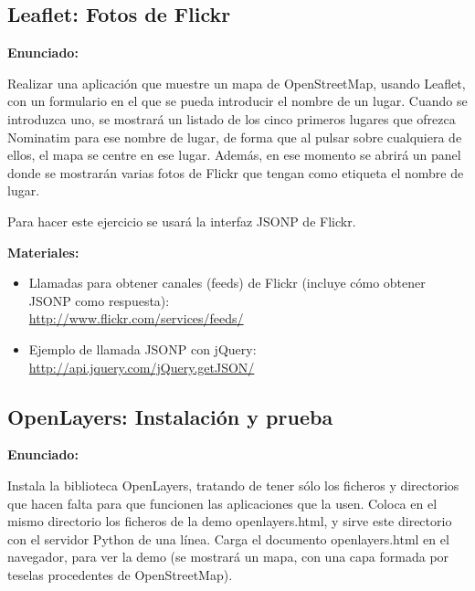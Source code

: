 \subsection{Leaflet: Fotos de Flickr}
\label{subsec:apis-leaflet-flickr}

\textbf{Enunciado:}

Realizar una aplicación que muestre un mapa de OpenStreetMap, usando Leaflet, con un formulario en el que se pueda introducir el nombre de un lugar. Cuando se introduzca uno, se mostrará un listado de los cinco primeros lugares que ofrezca Nominatim para ese nombre de lugar, de forma que al pulsar sobre cualquiera de ellos, el mapa se centre en ese lugar. Además, en ese momento se abrirá un panel donde se mostrarán varias fotos de Flickr que tengan como etiqueta el nombre de lugar.

Para hacer este ejercicio se usará la interfaz JSONP de Flickr.

\textbf{Materiales:}

\begin{itemize}
\item Llamadas para obtener canales (feeds) de Flickr (incluye cómo obtener JSONP como respuesta): \\
  \url{http://www.flickr.com/services/feeds/}
\item Ejemplo de llamada JSONP con jQuery: \\
  \url{http://api.jquery.com/jQuery.getJSON/}
\end{itemize}


\subsection{OpenLayers: Instalación y prueba}
\label{subsec:apis-openlayers-instal}

\textbf{Enunciado:}

Instala la biblioteca OpenLayers, tratando de tener sólo los ficheros y directorios que hacen falta para que funcionen las aplicaciones que la usen. Coloca en el mismo directorio los ficheros de la demo openlayers.html, y sirve este directorio con el servidor Python de una línea. Carga el documento openlayers.html en el navegador, para ver la demo (se mostrará un mapa, con una capa formada por teselas procedentes de OpenStreetMap).

